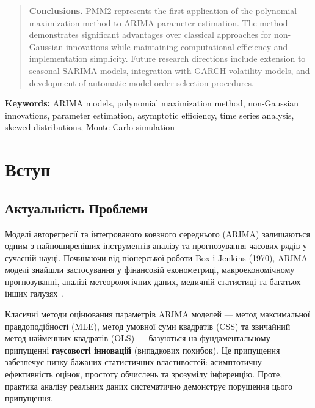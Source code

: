 \documentclass[12pt,a4paper]{article}
\begin{document}
\begin{abstract}
		\textbf{Conclusions.} PMM2 represents the first application of the polynomial maximization method to ARIMA parameter estimation. The method demonstrates significant advantages over classical approaches for non-Gaussian innovations while maintaining computational efficiency and implementation simplicity. Future research directions include extension to seasonal SARIMA models, integration with GARCH volatility models, and development of automatic model order selection procedures.
		
	\end{abstract}
	
	\noindent\textbf{Keywords:} ARIMA models, polynomial maximization method, non-Gaussian innovations, parameter estimation, asymptotic efficiency, time series analysis, skewed distributions, Monte Carlo simulation
	
	
	\newpage
	\tableofcontents
	\newpage
	
	\section{Вступ}
	\label{sec:introduction}
	
	\subsection{Актуальність Проблеми}
	\label{subsec:motivation}
	
	Моделі авторегресії та інтегрованого ковзного середнього (ARIMA) залишаються одним з найпоширеніших інструментів аналізу та прогнозування часових рядів у сучасній науці. Починаючи від піонерської роботи Box і Jenkins (1970), ARIMA моделі знайшли застосування у фінансовій економетриці, макроекономічному прогнозуванні, аналізі метеорологічних даних, медичній статистиці та багатьох інших галузях~\cite{box2015time,hyndman2021forecasting}.
	
	Класичні методи оцінювання параметрів ARIMA моделей --- метод максимальної правдоподібності (MLE), метод умовної суми квадратів (CSS) та звичайний метод найменших квадратів (OLS) --- базуються на фундаментальному припущенні \textbf{гаусовості інновацій} (випадкових похибок). Це припущення забезпечує низку бажаних статистичних властивостей: асимптотичну ефективність оцінок, простоту обчислень та зрозумілу інференцію. Проте, практика аналізу реальних даних систематично демонструє порушення цього припущення.
	
\end{document}
